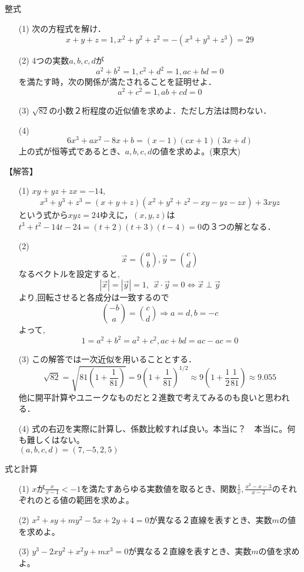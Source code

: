 \documentclass[a4paper,fleqn,dvipdfmx]{jsarticle}
\begin{document}
\newpage
\begin{itembox}[l]{整式}
\begin{itemize}
    \item [(1)] 次の方程式を解け．
    $$x+y+z=1,x^2+y^2+z^2=-(x^3+y^3+z^3)=29$$
    \item [(2)] 4つの実数$a,b,c,d$が
    $$a^2+b^2=1,c^2+d^2=1,ac+bd=0$$
    を満たす時，次の関係が満たされることを証明せよ．
    $$a^2+c^2=1,ab+cd=0$$
    \item [(3)] $\sqrt{82}$の小数２桁程度の近似値を求めよ．ただし方法は問わない．
    \item [(4)] $$6x^3+ax^2-8x+b=(x-1)(cx+1)(3x+d)$$
    上の式が恒等式であるとき、$a,b,c,d$の値を求めよ。(東京大)
\end{itemize}
\end{itembox}

\begin{flushleft}
【解答】
\end{flushleft}

\begin{itemize}
    \item [(1)] $xy+yz+zx=-14,$$$x^3+y^3+z^3=(x+y+z)(x^2+y^2+z^2-xy-yz-zx)+3xyz$$という式から$xyz=24$ゆえに，$(x,y,z)$は$t^3+t^2-14t-24=(t+2)(t+3)(t-4)=0$の３つの解となる．
    \item [(2)]  $$\overrightarrow{ x }= { a \choose b }  , \overrightarrow{ y }= { c \choose d }  $$
なるベクトルを設定すると,$$ \left| \overrightarrow{ x } \right|=\left| \overrightarrow{ y } \right|=1,\hspace{5pt}   \overrightarrow{ x }\cdot \overrightarrow{ y }=0 \iff  \overrightarrow{ x }  \perp  \overrightarrow{ y } $$
より,回転させると各成分は一致するので
$${ -b \choose a }={ c \choose d } \Rightarrow a=d,b=-c$$
よって,
$$1=a^2+b^2=a^2+c^2,ac+bd=ac-ac=0$$
    \item [(3)] この解答では一次近似を用いることとする．$$\sqrt{82}=\sqrt{81(1+\frac{1}{81})}=9(1+\frac{1}{81})^{1/2}\approx 9(1+\frac{1}{2}\frac{1}{81}) \approx 9.055$$
    他に開平計算やユニークなものだと２進数で考えてみるのも良いと思われる．
    \item [(4)] 式の右辺を実際に計算し、係数比較すれば良い。本当に？　本当に。何も難しくはない。\\$(a,b,c,d)=(7,-5,2,5)$
\end{itemize}



\newpage
\begin{itembox}[l]{式と計算}
\begin{itemize}
    \item [(1)] $x$が$\frac{x}{x-1}<-1$を満たすあらゆる実数値を取るとき、関数$\frac{1}{x},\frac{x^2-x-3}{x-2}$のそれぞれのとる値の範囲を求めよ。
    \item [(2)] $x^2+sy+my^2-5x+2y+4=0$が異なる２直線を表すとき、実数$m$の値を求めよ。
    \item [(3)] $y^3-2xy^2+x^2y+mx^3=0$が異なる２直線を表すとき、実数$m$の値を求めよ。
\end{itemize}
\end{itembox}
\end{document}
